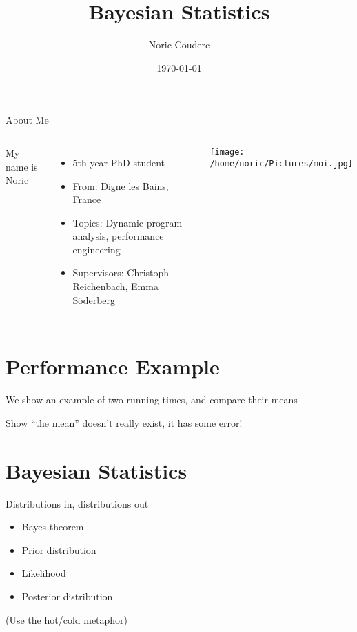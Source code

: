 \documentclass[aspectratio=169,xcolor=svgnames]{beamer}
\title[]{Bayesian Statistics}
\author{Noric Couderc}
\date{\today}
\institute{Lund University\\Department of Computer Science}
\begin{document}
\maketitle

\begin{frame}{About Me}
  \begin{columns}
    My name is Noric

    \begin{itemize}
    \item 5th year PhD student
    \item From: Digne les Bains, France
    \item Topics: Dynamic program analysis, performance engineering
    \item Supervisors: Christoph Reichenbach, Emma Söderberg
    \end{itemize}

    \texttt{[image: /home/noric/Pictures/moi.jpg]}

  \end{columns}
\end{frame}

\section{Performance Example}

\begin{frame}
  We show an example of two running times, and
  compare their means
\end{frame}

\begin{frame}
  Show ``the mean'' doesn't really exist, it has some error!
\end{frame}

\section{Bayesian Statistics}

\begin{frame}
  Distributions in, distributions out
\end{frame}

\begin{frame}
  \begin{itemize}
  \item Bayes theorem
  \item Prior distribution
  \item Likelihood
  \item Posterior distribution
  \end{itemize}

  (Use the hot/cold metaphor)
\end{frame}
\end{document}
